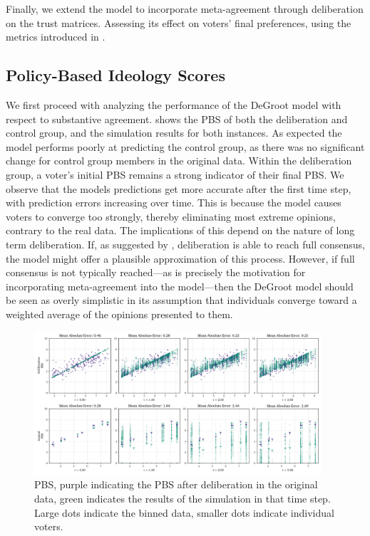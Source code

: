 Finally, we extend the model to incorporate meta-agreement through deliberation
on the trust matrices. Assessing its effect on voters’ final preferences, using
the metrics introduced in .

\subsection{Policy-Based Ideology Scores}

We first proceed with analyzing the performance of the DeGroot model with
respect to substantive agreement.  shows the PBS of both the
deliberation and control group, and the simulation results for both instances.
As expected the model performs poorly at predicting the control group, as there
was no significant change for control group members in the original data.
Within the deliberation group, a voter's initial PBS remains a strong indicator
of their final PBS. We observe that the models predictions get more accurate
after the first time step, with prediction errors increasing over time. This is
because the model causes voters to converge too strongly, thereby eliminating
most extreme opinions, contrary to the real data. The implications of this
depend on the nature of long term deliberation. If, as suggested by
\citet{elsterMarketForumThree2002}, deliberation is able to reach full
consensus, the model might offer a plausible approximation of this process.
However, if full consensus is not typically reached—as is precisely the
motivation for incorporating meta-agreement into the model—then the DeGroot
model should be seen as overly simplistic in its assumption that individuals
converge toward a weighted average of the opinions presented to them.

\begin{figure}[ht]
	\begin{center}
		\includegraphics[width=0.95\textwidth]{Figures/pbs_scores.png}
	\end{center}
	\caption{ PBS, purple indicating the PBS after deliberation in the original data, green indicates the results of the simulation in that time step. Large dots indicate the binned data, smaller dots indicate individual voters.}\label{fig:pbs}
\end{figure}

